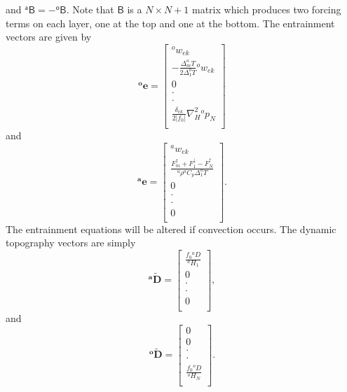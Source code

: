 \documentclass[11pt, a4paper,twoside]{article}
\newcommand{\dt}[2]{\Delta_{#2}^{#1}T}
\newcommand{\rhb}[1]{{{}^{#1}\rho}}
\newcommand{\cp}[1]{{{}^{#1}C_p}}
\newcommand{\p}[2]{{{}^{#1}p_{#2}}}
\newcommand{\ek}[1]{{{}^{#1}w_{ek}}}
\newcommand{\HH}[2]{{{}^{#1}H_{#2}}}
\newcommand{\Fup}[1]{{F^{\uparrow}_{#1}}}
\newcommand{\Fdown}[1]{{F^{\downarrow}_{#1}}}
\newcommand{\vc}[1]{\mathbf{#1}}
\newcommand{\mtx}[1]{\vc{\mathsf{#1}}}
\newcommand{\D}[1]{{}^{#1}D}
\newcommand{\Dt}[1]{\vc{{}^{#1}\tilde{D}}}
\newcommand{\delek}[0]{\delta_{ek}}
\numberwithin{equation}{section}
\begin{document}
and $\mtx{{}^aB} = - \mtx{{}^oB} $.
Note that $\mtx{B}$ is a $N \times N+1$ matrix which produces two forcing terms on each layer, one at the top and one at the bottom.
The entrainment vectors are given by
\begin{equation}
\vc{{}^oe} =
\left[ \begin{array}{c}
\ek{o}\\
- \frac{\dt{o}{m}}{2 \dt{o}{1}} \ek{o}\\
0\\
\cdot\\
\cdot\\
\frac{\delek}{2 \lvert f_0 \rvert }\nabla_H^2\p{o}{N}\\
 \end{array}\right]
\end{equation}
and
\begin{equation}\label{eq:ent1a}
\vc{{}^ae} =
\left[ \begin{array}{c}
\ek{a}\\
\frac{\Fup{m}+ \Fdown{1}   - \Fup{N}  }{\rhb{a} \cp{a} \dt{a}{1} }\\
0\\
\cdot\\
\cdot\\
0\\
 \end{array}\right].
\end{equation}
The entrainment equations will be altered if convection occurs.
The dynamic topography vectors are simply
\begin{equation}\label{eq:matda}
\Dt{a} =
\left[ \begin{array}{c}
\frac{f_0 \D{a}}{\HH{a}{1}}\\
0\\
\cdot\\
\cdot\\
0\\
 \end{array}\right],
\end{equation}
and
\begin{equation}\label{eq:matdo}
\Dt{o} =
\left[ \begin{array}{c}
0\\
0\\
\cdot\\
\cdot\\
\frac{f_0 \D{o}}{\HH{o}{N}}\\
 \end{array}\right].
\end{equation}
\end{document}
